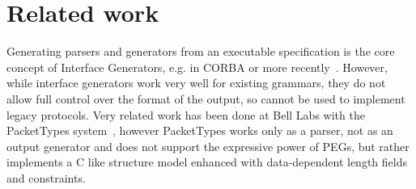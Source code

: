 \section{Related work}

Generating parsers and generators from an executable specification
is the core concept of Interface Generators, e.g. in CORBA or more
recently~\cite{varda2008}. However, while interface generators work
very well for existing grammars, they do not allow full control over the
format of the output, so cannot be used to implement legacy protocols.
Very related work has been done at Bell Labs with the PacketTypes
system~\cite{mccann2000packet}, however PacketTypes works only as a
parser, not as an output generator and does not support the expressive
power of PEGs, but rather implements a C like structure model enhanced
with data-dependent length fields and constraints.

